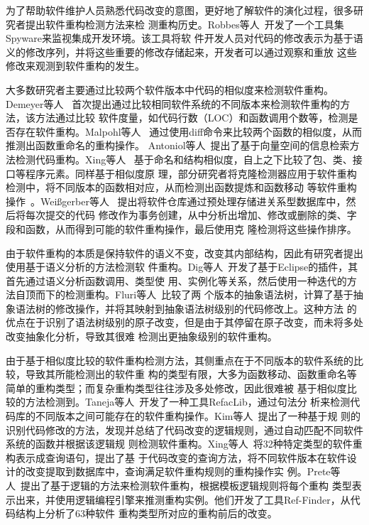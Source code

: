 为了帮助软件维护人员熟悉代码改变的意图，更好地了解软件的演化过程，很多研究者提出软件重构检测方法来检
测重构历史。Robbes等人~\cite{robbes2008spyware}开发了一个工具集Spyware来监视集成开发环境。该工具将软
件开发人员对代码的修改表示为基于语义的修改序列，并将这些重要的修改存储起来，开发者可以通过观察和重放
这些修改来观测到软件重构的发生。

大多数研究者主要通过比较两个软件版本中代码的相似度来检测软件重构。Demeyer等人
~\cite{demeyer2000finding}首次提出通过比较相同软件系统的不同版本来检测软件重构的方法，该方法通过比较
软件度量，如代码行数（LOC）和函数调用个数等，检测是否存在软件重构。Malpohl等人
~\cite{malpohl2003renaming}通过使用diff命令来比较两个函数的相似度，从而推测出函数重命名的重构操作。
Antoniol等人~\cite{antoniol2004automatic}提出了基于向量空间的信息检索方法检测代码重构。Xing等人
~\cite{xing2005umldiff}基于命名和结构相似度，自上之下比较了包、类、接口等程序元素。同样基于相似度原
理，部分研究者将克隆检测器应用于软件重构检测中，将不同版本的函数相对应，从而检测出函数提炼和函数移动
等软件重构操作~\cite{van2003reconstruction,kim2005functions}。Weißgerber等人
~\cite{weissgerber2006identifying}提出将软件仓库通过预处理存储进关系型数据库中，然后将每次提交的代码
修改作为事务创建，从中分析出增加、修改或删除的类、字段和函数，从而得到可能的软件重构操作，最后使用克
隆检测将这些操作排序。

由于软件重构的本质是保持软件的语义不变，改变其内部结构，因此有研究者提出使用基于语义分析的方法检测软
件重构。Dig等人~\cite{dig2006automated}开发了基于Eclipse的插件，其首先通过语义分析函数调用、类型使
用、实例化等关系，然后使用一种迭代的方法自顶而下的检测重构。Fluri等人~\cite{fluri2007change}比较了两
个版本的抽象语法树，计算了基于抽象语法树的修改操作，并将其映射到抽象语法树级别的代码修改上。这种方法
的优点在于识别了语法树级别的原子改变，但是由于其停留在原子改变，而未将多处改变抽象化分析，导致其很难
检测出更抽象级别的软件重构。

由于基于相似度比较的软件重构检测方法，其侧重点在于不同版本的软件系统的比较，导致其所能检测出的软件重
构的类型有限，大多为函数移动、函数重命名等简单的重构类型；而复杂重构类型往往涉及多处修改，因此很难被
基于相似度比较的方法检测到。Taneja等人~\cite{taneja2007automated}开发了一种工具RefacLib，通过句法分
析来检测代码库的不同版本之间可能存在的软件重构操作。Kim等人~\cite{kim2007automatic}提出了一种基于规
则的识别代码修改的方法，发现并总结了代码改变的逻辑规则，通过自动匹配不同软件系统的函数并根据该逻辑规
则检测软件重构。Xing等人~\cite{xing2006refactoring}将32种特定类型的软件重构表示成查询语句，提出了基
于代码改变的查询方法，将不同软件版本在软件设计的改变提取到数据库中，查询满足软件重构规则的重构操作实
例。Prete等人~\cite{prete2010template}提出了基于逻辑的方法来检测软件重构，根据模板逻辑规则将每个重构
类型表示出来，并使用逻辑编程引擎来推测重构实例。他们开发了工具Ref-Finder，从代码结构上分析了63种软件
重构类型所对应的重构前后的改变。


